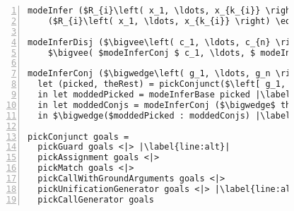 


\begin{figure}[h]
  \centering
  \begin{minipage}{\columnwidth}
    \begin{lstlisting}[label={fig:modeInference},
                       caption={Mode inference pseudocode},
                       captionpos=b,
                       frame=tb,
                       escapechar=|,
                       numbers=left,
                       numberstyle={\footnotesize}]
modeInfer ($R_{i}\left( x_1, \ldots, x_{k_{i}} \right) \equiv body$) = 
    ($R_{i}\left( x_1, \ldots, x_{k_{i}} \right) \equiv$ (modeInferDisj body)) |\label{line:body}|

modeInferDisj ($\bigvee\left( c_1, \ldots, c_{n} \right)$) = 
    $\bigvee( $modeInferConj $ c_1, \ldots, $ modeInferConj $ c_{n})$ |\label{line:disj}|

modeInferConj ($\bigwedge\left( g_1, \ldots, g_n \right)$) =
  let (picked, theRest) = pickConjunct($\left[ g_1, \ldots, g_n \right]$) |\label{line:pick}|
  in let moddedPicked = modeInferBase picked |\label{line:pick_analyze}|
  in let moddedConjs = modeInferConj ($\bigwedge$ theRest) |\label{line:conj}|
  in $\bigwedge($moddedPicked : moddedConjs) |\label{line:result}|

pickConjunct goals =
  pickGuard goals <|> |\label{line:alt}|
  pickAssignment goals <|>
  pickMatch goals <|>
  pickCallWithGroundArguments goals <|>
  pickUnificationGenerator goals <|> |\label{line:alt2}|
  pickCallGenerator goals
    \end{lstlisting}
  \end{minipage}
\end{figure}